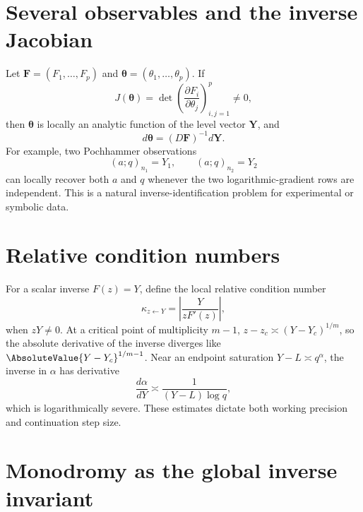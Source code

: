 \documentclass[11pt,a4paper,oneside,openany]{book}
\theoremstyle{definition}
\theoremstyle{remark}
\begin{document}
\section{Several observables and the inverse Jacobian}

Let \(\bm F=(F_1,\ldots,F_p)\) and \(\bm\theta=(\theta_1,\ldots,\theta_p)\).
If
\begin{equation}\label{eq:inverse-jacobian-condition}
 J(\bm\theta)=\det\left(\frac{\partial F_i}{\partial\theta_j}\right)_{i,j=1}^p
 \ne0,
\end{equation}
then \(\bm\theta\) is locally an analytic function of the level vector
\(\bm Y\), and
\begin{equation}\label{eq:inverse-jacobian-differential}
 d\bm\theta=(D\bm F)^{-1}d\bm Y.
\end{equation}
For example, two Pochhammer observations
\begin{equation}\label{eq:two-observation-pair}
 (a;q)_{n_1}=Y_1,
 \qquad
 (a;q)_{n_2}=Y_2
\end{equation}
can locally recover both \(a\) and \(q\) whenever the two logarithmic-gradient
rows are independent.  This is a natural inverse-identification problem for
experimental or symbolic data.

\section{Relative condition numbers}

For a scalar inverse \(F(z)=Y\), define the local relative condition number
\begin{equation}\label{eq:relative-condition-number}
 \kappa_{z\leftarrow Y}
 =\left|\frac{Y}{zF'(z)}\right|,
\end{equation}
when \(zY\ne0\).  At a critical point of multiplicity \(m-1\),
\(z-z_c\asymp(Y-Y_c)^{1/m}\), so the absolute derivative of the inverse
diverges like \(\AbsoluteValue{Y-Y_c}^{1/m-1}\).  Near an endpoint saturation
\(Y-L\asymp q^\alpha\), the inverse in \(\alpha\) has derivative
\begin{equation}\label{eq:endpoint-condition}
 \frac{d\alpha}{dY}\asymp\frac1{(Y-L)\log q},
\end{equation}
which is logarithmically severe.  These estimates dictate both working
precision and continuation step size.

\section{Monodromy as the global inverse invariant}
\end{document}
